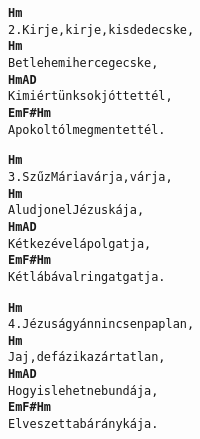 \begin{minipage}{\textwidth}
\kottastart
{}
\kottaend
\begin{minipage}{\textwidth}
\begin{multicols}{2}
\begin{minipage}{\textwidth}
\begin{alltt}
\textbf{    Hm}
2. Kirje, kirje, kisdedecske,
\textbf{    Hm}
   Betlehemi hercegecske,
\textbf{    Hm                  A  D}
   Ki miértünk sok jót tettél,
\textbf{   Em          F#    Hm}
   A pokoltól megmentettél.
\end{alltt}
\vspace{0.0cm}
\versszakspacing
\end{minipage}
\begin{minipage}{\textwidth}
\begin{alltt}
\textbf{    Hm}
3. Szűz Mária várja, várja,
\textbf{   Hm}
   Aludjon el Jézuskája,
\textbf{    Hm              A  D}
   Két kezével ápolgatja,
\textbf{    Em          F#    Hm}
   Két lábával ringatgatja.
\end{alltt}
\vspace{0.0cm}
\versszakspacing
\end{minipage}
\begin{minipage}{\textwidth}
\begin{alltt}
\textbf{    Hm}
4. Jézus ágyán nincsen paplan,
\textbf{    Hm}
   Jaj, de fázik az ártatlan,
\textbf{    Hm                 A D}
   Hogy is lehetne bundája,
\textbf{   Em           F#    Hm}
   Elveszett a báránykája.
\end{alltt}
\vspace{0.0cm}
\versszakspacing
\end{minipage}
\vspace{0.2cm}
\end{multicols}
\end{minipage}

\end{minipage}
~\vspace{1.0cm}
\newline
